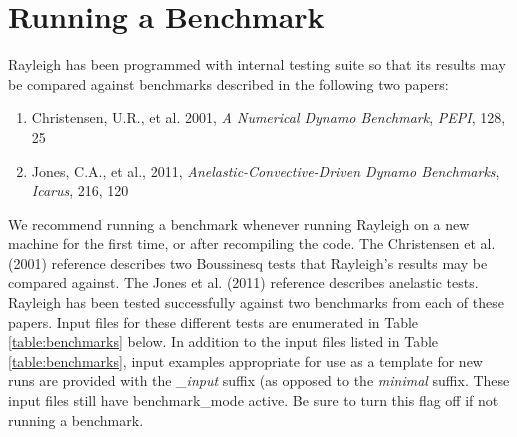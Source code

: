 \clearpage






\section{Running a Benchmark}\label{sec:benchmarking}



Rayleigh has been programmed with internal testing suite so that its results may be compared against benchmarks described in the following two papers:
\begin{enumerate}
\item Christensen, U.R., et al. 2001, \textit{A Numerical Dynamo Benchmark}, \textit{PEPI}, 128, 25
\item Jones, C.A., et al., 2011, \textit{Anelastic-Convective-Driven Dynamo Benchmarks}, \textit{Icarus}, 216, 120
\end{enumerate}

We recommend running a benchmark whenever running Rayleigh on a new machine for the first time, or after recompiling the code. The Christensen et al. (2001) reference describes two Boussinesq tests that Rayleigh's results may be compared against.   The Jones et al. (2011) reference describes anelastic tests.  Rayleigh has been tested successfully against two benchmarks from each of these papers.  Input files for these different tests are enumerated in Table \ref{table:benchmarks} below.  In addition to the input files listed in Table \ref{table:benchmarks}, input examples appropriate for use as a template for new runs are provided with the \textit{\_input} suffix (as opposed to the \textit{minimal} suffix.  These input files still have benchmark\_mode active.  Be sure to turn this flag off if not running a benchmark.

